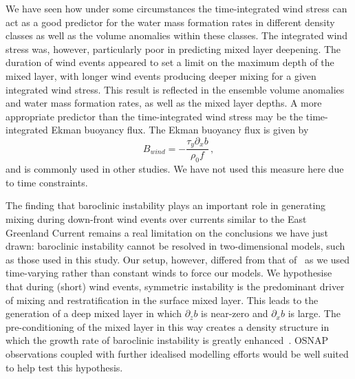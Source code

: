 We have seen how under some circumstances the time-integrated wind stress can act as a good predictor for the water mass formation rates in different density classes as well as the volume anomalies within these classes. The integrated wind stress was, however, particularly poor in predicting mixed layer deepening. The duration of wind events appeared to set a limit on the maximum depth of the mixed layer, with longer wind events producing deeper mixing for a given integrated wind stress. This result is reflected in the ensemble volume anomalies and water mass formation rates, as well as the mixed layer depths. A more appropriate predictor than the time-integrated wind stress may be the time-integrated Ekman buoyancy flux. The Ekman buoyancy flux is given by
\begin{equation}
    B_{wind} = -\frac{\tau_y \partial_x b}{\rho_0 f} \, ,
\end{equation}
and is commonly used in other studies. We have not used this measure here due to time constraints.

The finding that baroclinic instability plays an important role in generating mixing during down-front wind events over currents similar to the East Greenland Current \citep{Spall2016} remains a real limitation on the conclusions we have just drawn: baroclinic instability cannot be resolved in two-dimensional models, such as those used in this study.
Our setup, however, differed from that of~\citet{Spall2016} as we used time-varying rather than constant winds to force our models. We hypothesise that during (short) wind events, symmetric instability is the predominant driver of mixing and restratification in the surface mixed layer. This leads to the generation of a deep mixed layer in which $\partial_z b$ is near-zero and $\partial_x b$ is large. The pre-conditioning of the mixed layer in this way creates a density structure in which the growth rate of baroclinic instability is greatly enhanced~\citep{Eady1949}. OSNAP observations coupled with further idealised modelling efforts would be well suited to help test this hypothesis.